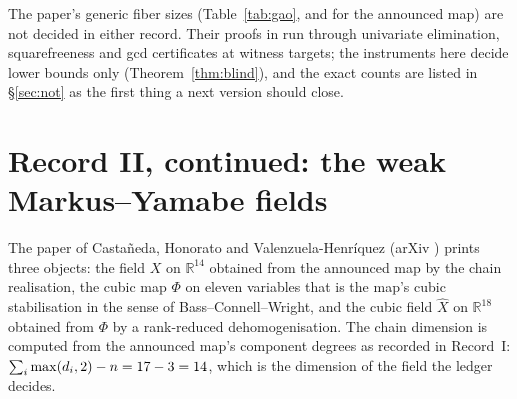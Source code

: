 \documentclass[11pt]{article}
\begin{document}
\begin{table}[t]\centering\small
{}
\caption{Gao's five maps. ``Terms'' counts all components; ``points'' is the number of distinct
rational points sharing one image; ``generic fiber'' is the paper's theorem statement, read
from the pinned TeX and not decided here. The whole ledger re-derives in about \PolySeconds{}
seconds.}\label{tab:gao}
\end{table}

The paper's generic fiber sizes (Table~\ref{tab:gao}, and \FiberAlpoge{} for the announced map)
are not decided in either record. Their proofs in \cite{Gao2026} run through univariate
elimination, squarefreeness and gcd certificates at witness targets; the instruments here
decide lower bounds only (Theorem~\ref{thm:blind}), and the exact counts are listed in
\S\ref{sec:not} as the first thing a next version should close.

\section{Record II, continued: the weak Markus--Yamabe fields}\label{sec:my}

The paper of Casta\~neda, Honorato and Valenzuela-Henr\'iquez \cite{CHV2026} (arXiv \ChvArxiv)
prints three objects: the field $X$ on $\mathbb{R}^{14}$ obtained from the announced map by the
chain realisation, the cubic map $\Phi$ on eleven variables that is the map's cubic stabilisation
in the sense of Bass--Connell--Wright, and the cubic field $\widehat X$ on $\mathbb{R}^{18}$
obtained from $\Phi$ by a rank-reduced dehomogenisation. The chain dimension is computed from the
announced map's component degrees as recorded in Record~I: $\sum_i\max(d_i,2)-n=17-3=
14$, which is the dimension of the field the ledger decides.
\end{document}
